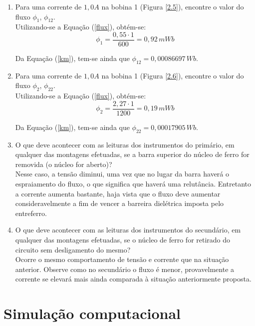 \documentclass[a4paper,12pt,oneside,openany,table,xcdraw]{article}
\begin{document}
\begin{enumerate}[1 - ]
\item Para uma corrente de $1,0 A$ na bobina 1 (Figura \ref{2.5}), encontre o valor do fluxo $\phi_1$, $\phi_{12}$. \\
Utilizando-se a Equação (\ref{flux}), obtém-se:
\begin{equation*}
\phi_1=\dfrac{0,55\cdot 1}{600} = 0,92\, mWb
\end{equation*}

Da Equação (\ref{km}), tem-se ainda que $\phi_{12}=0,00086697\, Wb$.


\item Para uma corrente de $1,0 A$ na bobina 1 (Figura \ref{2.6}), encontre o valor do fluxo $\phi_2$, $\phi_{22}$. \\
Utilizando-se a Equação (\ref{flux}), obtém-se:
\begin{equation*}
\phi_2=\dfrac{2,27\cdot 1}{1200} = 0,19\, mWb
\end{equation*}

Da Equação (\ref{km}), tem-se ainda que $\phi_{22} =0,00017905\, Wb$.

\item O que deve acontecer com as leituras dos instrumentos do primário, em qualquer das
montagens efetuadas, se a barra superior do núcleo de ferro for removida (o núcleo for
aberto)? \\
Nesse caso, a tensão diminui, uma vez que no lugar da barra haverá o espraiamento do fluxo, o que significa que haverá uma relutância. Entretanto a corrente aumenta bastante, haja vista que o fluxo deve aumentar consideravelmente a fim de vencer a barreira dielétrica imposta pelo entreferro.

\item O que deve acontecer com as leituras dos instrumentos do secundário, em qualquer das
montagens efetuadas, se o núcleo de ferro for retirado do circuito sem desligamento do
mesmo? \\
Ocorre o mesmo comportamento de tensão e corrente que na situação anterior. Observe como no secundário o fluxo é menor, provavelmente a corrente se elevará mais ainda comparada à situação anteriormente proposta.


\end{enumerate}

\section{Simulação computacional} %
\end{document}

